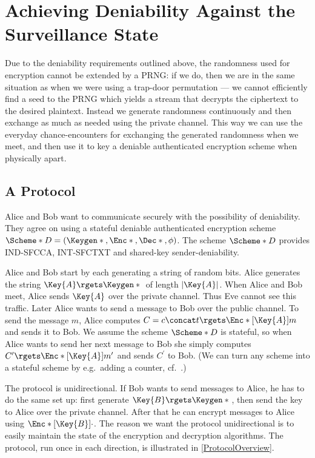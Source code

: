 \section{Achieving Deniability Against the Surveillance State}
\label{AchievingDeniability}

Due to the deniability requirements outlined above, the randomness used for 
encryption cannot be extended by a \ac{PRNG}: if we do, then we are in the same 
situation as when we were using a trap-door permutation --- we cannot 
efficiently find a seed to the \ac{PRNG} which yields a stream that decrypts 
the ciphertext to the desired plaintext.
Instead we generate randomness continuously and then exchange as much as needed 
using the private channel.
This way we can use the everyday chance-encounters for exchanging the generated 
randomness when we meet, and then use it to key a deniable authenticated 
encryption scheme when physically apart.

\subsection{A Protocol}
\label{TheProtocol}

Alice and Bob want to communicate securely with the possibility of deniability.
They agree on using a stateful deniable authenticated encryption scheme 
\(\Scheme*{D} = (\Keygen*{}, \Enc*{}, \Dec*{}, \phi)\).
The scheme \(\Scheme*{D}\) provides \ac{IND-SFCCA}, \ac{INT-SFCTXT} and 
shared-key sender-deniability.

Alice and Bob start by each generating a string of random bits.
Alice generates the string \(\Key{A}\rgets \Keygen*{}\) of length 
\(|\Key{A}|\).
When Alice and Bob meet, Alice sends \(\Key{A}\) over the private channel.
Thus Eve cannot see this traffic.
Later Alice wants to send a message to Bob over the public channel.
To send the message \(m\), Alice computes \(C = c\concat t\rgets 
  \Enc*[\Key{A}]{m}\) and sends it to Bob.
We assume the scheme \(\Scheme*{D}\) is stateful, so when Alice wants to send 
her next message to Bob she simply computes \(C^\prime\rgets \Enc*[\Key{A}]{ 
    m^\prime }\) and sends \(C^\prime\) to Bob.
(We can turn any scheme into a stateful scheme by e.g.\ adding a counter, 
cf.~\cite{StatefulDecryption}.)

The protocol is unidirectional.
If Bob wants to send messages to Alice, he has to do the same set up:
first generate \(\Key{B}\rgets \Keygen*{}\), then send the key to Alice over 
the private channel.
After that he can encrypt messages to Alice using \(\Enc*[\Key{B}]{\cdot}\).
The reason we want the protocol unidirectional is to easily maintain the state 
of the encryption and decryption algorithms.
The protocol, run once in each direction, is illustrated in 
\cref{ProtocolOverview}.

